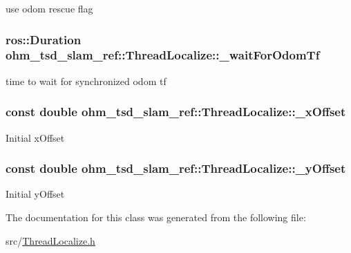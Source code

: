 use odom rescue flag \hypertarget{classohm__tsd__slam__ref_1_1ThreadLocalize_a5f43425ab2bb540e72205ef83e37d4ff}{
\subsubsection[{\-\_\-wait\-For\-Odom\-Tf}]{\setlength{\rightskip}{0pt plus 5cm}ros\-::\-Duration ohm\-\_\-tsd\-\_\-slam\-\_\-ref\-::\-Thread\-Localize\-::\-\_\-wait\-For\-Odom\-Tf\hspace{0.3cm}{\ttfamily [private]}}}\label{classohm__tsd__slam__ref_1_1ThreadLocalize_a5f43425ab2bb540e72205ef83e37d4ff}
time to wait for synchronized odom tf \hypertarget{classohm__tsd__slam__ref_1_1ThreadLocalize_a2bfa898645a8b505fbc317829da277cf}{
\subsubsection[{\-\_\-x\-Offset}]{\setlength{\rightskip}{0pt plus 5cm}const double ohm\-\_\-tsd\-\_\-slam\-\_\-ref\-::\-Thread\-Localize\-::\-\_\-x\-Offset\hspace{0.3cm}{\ttfamily [private]}}}\label{classohm__tsd__slam__ref_1_1ThreadLocalize_a2bfa898645a8b505fbc317829da277cf}
Initial x\-Offset \hypertarget{classohm__tsd__slam__ref_1_1ThreadLocalize_afd9255f70ea924f91b0e628d20245803}{
\subsubsection[{\-\_\-y\-Offset}]{\setlength{\rightskip}{0pt plus 5cm}const double ohm\-\_\-tsd\-\_\-slam\-\_\-ref\-::\-Thread\-Localize\-::\-\_\-y\-Offset\hspace{0.3cm}{\ttfamily [private]}}}\label{classohm__tsd__slam__ref_1_1ThreadLocalize_afd9255f70ea924f91b0e628d20245803}
Initial y\-Offset 

The documentation for this class was generated from the following file\-:\begin{DoxyCompactItemize}
\item 
src/\hyperlink{ThreadLocalize_8h}{Thread\-Localize.\-h}\end{DoxyCompactItemize}
